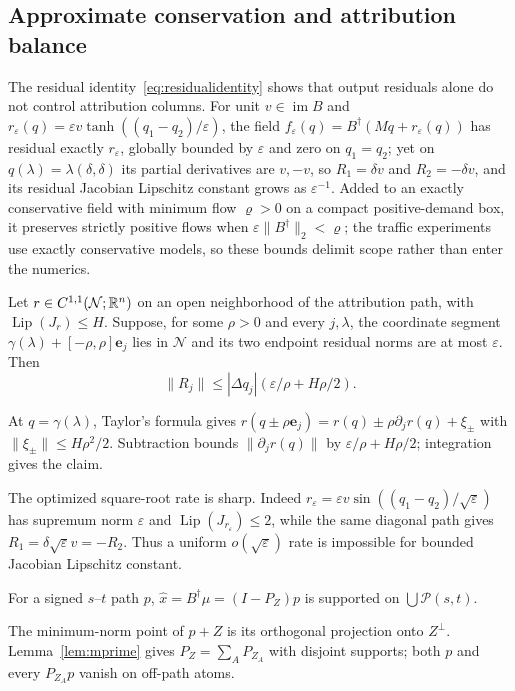 \subsection{Approximate conservation and attribution balance}\label{app:approx}\label{app:failurestatement}
The residual identity~\eqref{eq:residualidentity} shows that output residuals alone do not control attribution columns. For unit $v\in\operatorname{im}B$ and
$r_\varepsilon(q)=\varepsilon v\tanh((q_1-q_2)/\varepsilon)$, the field $f_\varepsilon(q)=B^\dagger(Mq+r_\varepsilon(q))$ has residual exactly $r_\varepsilon$, globally bounded by $\varepsilon$ and zero on $q_1=q_2$; yet on $q(\lambda)=\lambda(\delta,\delta)$ its partial derivatives are $v,-v$, so $R_1=\delta v$ and $R_2=-\delta v$, and its residual Jacobian Lipschitz constant grows as $\varepsilon^{-1}$. Added to an exactly conservative field with minimum flow $\varrho>0$ on a compact positive-demand box, it preserves strictly positive flows when $\varepsilon\|B^\dagger\|_2<\varrho$; the traffic experiments use exactly conservative models, so these bounds delimit scope rather than enter the numerics.

\begin{theorem}\label{thm:t1pmain}
Let $r\in C^{1,1}(\mathcal N;\mathbb{R}^n)$ on an open neighborhood of the attribution path, with $\operatorname{Lip}(J_r)\le H$. Suppose, for some $\rho>0$ and every $j,\lambda$, the coordinate segment $\gamma(\lambda)+[-\rho,\rho]\mathbf e_j$ lies in $\mathcal N$ and its two endpoint residual norms are at most $\varepsilon$. Then
\[
\|R_j\|\le|\Delta q_j|(\varepsilon/\rho+H\rho/2).
\]
\end{theorem}
\begin{pf}
At $q=\gamma(\lambda)$, Taylor's formula gives $r(q\pm\rho\mathbf e_j)=r(q)\pm\rho\partial_jr(q)+\xi_\pm$ with $\|\xi_\pm\|\le H\rho^2/2$. Subtraction bounds $\|\partial_jr(q)\|$ by $\varepsilon/\rho+H\rho/2$; integration gives the claim.
\end{pf}
The optimized square-root rate is sharp. Indeed $r_\varepsilon=\varepsilon v\sin((q_1-q_2)/\sqrt\varepsilon)$ has supremum norm $\varepsilon$ and $\operatorname{Lip}(J_{r_\varepsilon})\le2$, while the same diagonal path gives $R_1=\delta\sqrt\varepsilon v=-R_2$. Thus a uniform $o(\sqrt\varepsilon)$ rate is impossible for bounded Jacobian Lipschitz constant.

\begin{lemma}\label{lem:s}
For a signed $s$--$t$ path $p$, $\hat x=B^\dagger\mu=(I-P_Z)p$
is supported on $\bigcup\mathcal P(s,t)$.
\end{lemma}
\begin{pf}
The minimum-norm point of $p+Z$ is its orthogonal projection onto
$Z^\perp$. Lemma~\ref{lem:mprime} gives
$P_Z=\sum_A P_{Z_A}$ with disjoint supports; both $p$ and every
$P_{Z_A}p$ vanish on off-path atoms.
\end{pf}

